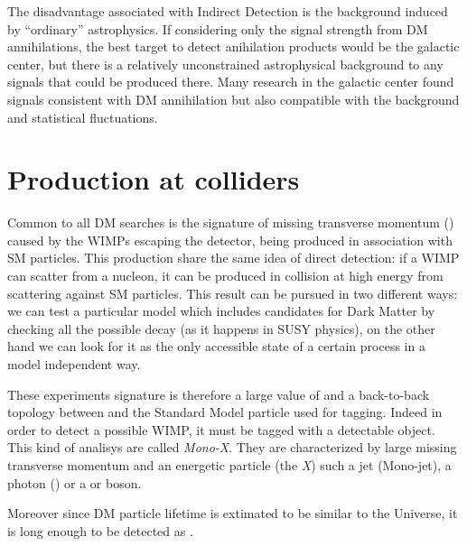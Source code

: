 The disadvantage associated with Indirect Detection is the background induced by ``ordinary'' astrophysics. If considering only the signal strength from DM annihilations, the best target to detect anihilation products would be the galactic center, but there is a relatively unconstrained astrophysical background to any signals that could be produced there. Many research in the galactic center found signals consistent with DM annihilation but also compatible with the background and statistical fluctuations.

\section{Production at colliders}
Common to all DM searches is the signature of missing transverse momentum (\met) caused by the WIMPs escaping the detector, being produced in association with SM particles. This production share the same idea of direct detection: if a WIMP can scatter from a nucleon, it can be produced in \pp collision at high energy from scattering against SM particles. This result can be pursued in two different ways: we can test a particular model which includes candidates for Dark Matter by checking all the possible decay (as it happens in SUSY physics), on the other hand we can look for it as the only accessible state of a certain process in a model independent way.

These experiments signature is therefore a large value of \met and a back-to-back topology between \met and the Standard Model particle used for tagging. Indeed in order to detect a possible WIMP, it must be tagged with a detectable object. This kind of analisys are called \emph{Mono-X}. They are  characterized by large missing transverse momentum and an energetic particle (the \emph{X}) such a jet (Mono-jet), a photon (\mph) or a \Wboson or \Zboson boson. 

Moreover since DM particle lifetime is extimated to be similar to the Universe, it is long enough to be detected as \met.

